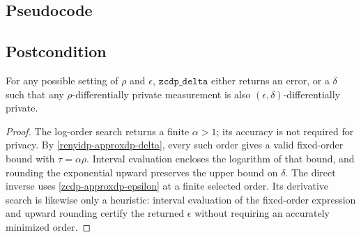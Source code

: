 \documentclass{article}
\begin{document}
\subsection*{Pseudocode}



\subsection*{Postcondition}

\begin{theorem}
    For any possible setting of $\rho$ and $\epsilon$, $\texttt{zcdp\_delta}$ either returns an error,
    or a $\delta$ such that any $\rho$-differentially private measurement is also $(\epsilon, \delta)$-differentially private.
\end{theorem}
\begin{proof}
The log-order search returns a finite $\alpha>1$; its accuracy is not
required for privacy. By \ref{renyidp-approxdp-delta}, every such order
gives a valid fixed-order bound with $\tau=\alpha\rho$.
Interval evaluation encloses the logarithm of that bound, and rounding
the exponential upward preserves the upper bound on $\delta$.
The direct inverse uses \ref{zcdp-approxdp-epsilon} at a finite selected
order. Its derivative search is likewise only a heuristic: interval
evaluation of the fixed-order expression and upward rounding certify
the returned $\epsilon$ without requiring an accurately minimized order.
\end{proof}




\end{document}
